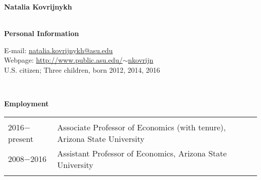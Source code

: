 \documentclass[11pt]{article}
\begin{document}
\begin{center}
{\Large\textbf{Natalia Kovrijnykh}}\\

{\large\textbf{}}\\
\end{center}


\vspace{.2cm}

\textbf{Personal Information}

\vspace{.3cm}

E-mail: \href{mailto:natalia.kovrijnykh@asu.edu}{natalia.kovrijnykh@asu.edu} \\
Webpage: \href{http://www.public.asu.edu/~nkovrijn}{http://www.public.asu.edu/$\sim$nkovrijn}\\
U.S. citizen; 
Three children, born 2012, 2014, 2016

\ \

\textbf{Employment}

\begin{tabular}{l l}
 \hspace{.1in} & \\
2016$-$present \hspace{.15in} & Associate Professor of Economics (with tenure), Arizona State University \\
2008$-$2016 \hspace{.15in} & Assistant Professor of Economics, Arizona State University \\
 \hspace{.1in} & \\
\end{tabular}
\end{document}
